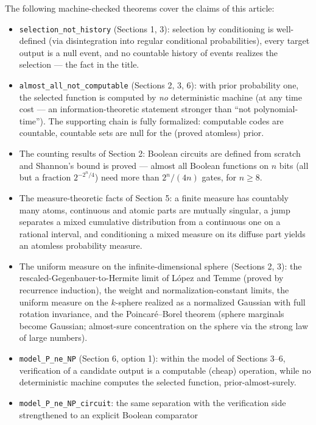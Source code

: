 \documentclass[11pt,a4paper]{report}
\begin{document}
The following machine-checked theorems cover the claims of this article:

\begin{itemize}
\item
  \texttt{selection\_not\_history} (Sections 1, 3): selection by
  conditioning is well-defined (via disintegration into regular
  conditional probabilities), every target output is a null event, and no
  countable history of events realizes the selection --- the fact in the
  title.
\item
  \texttt{almost\_all\_not\_computable} (Sections 2, 3, 6): with prior
  probability one, the selected function is computed by \emph{no}
  deterministic machine (at any time cost --- an information-theoretic
  statement stronger than ``not polynomial-time''). The supporting chain
  is fully formalized: computable codes are countable, countable sets are
  null for the (proved atomless) prior.
\item
  The counting results of Section 2: Boolean circuits are defined from
  scratch and Shannon's bound is proved --- almost all Boolean functions
  on \(n\) bits (all but a fraction \(2^{-2^{n}/4}\)) need more than
  \(2^{n}/(4n)\) gates, for \(n \geq 8\).
\item
  The measure-theoretic facts of Section 5: a finite measure has
  countably many atoms, continuous and atomic parts are mutually
  singular, a jump separates a mixed cumulative distribution from a
  continuous one on a rational interval, and conditioning a mixed measure
  on its diffuse part yields an atomless probability measure.
\item
  The uniform measure on the infinite-dimensional sphere (Sections 2, 3):
  the rescaled-Gegenbauer-to-Hermite limit of L\'opez and Temme (proved
  by recurrence induction), the weight and normalization-constant limits,
  the uniform measure on the \(k\)-sphere realized as a normalized
  Gaussian with full rotation invariance, and the Poincar\'e--Borel
  theorem (sphere marginals become Gaussian; almost-sure concentration on
  the sphere via the strong law of large numbers).
\item
  \texttt{model\_P\_ne\_NP} (Section 6, option 1): within the model of
  Sections 3--6, verification of a candidate output is a computable
  (cheap) operation, while no deterministic machine computes the selected
  function, prior-almost-surely.
\item
  \texttt{model\_P\_ne\_NP\_circuit}: the same separation with the
  verification side strengthened to an explicit Boolean comparator

\end{itemize}
\end{document}
